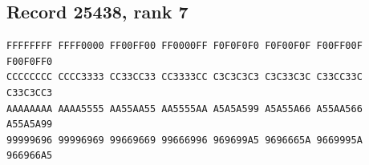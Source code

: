 \documentclass[11pt]{amsart}
\theoremstyle{definition}
\theoremstyle{remark}
\numberwithin{equation}{section}
\numberwithin{table}{section}
\begin{document}
\subsection*{Record 25438, rank 7}
\begin{Verbatim}[fontsize=\scriptsize,xleftmargin=1em]
FFFFFFFF FFFF0000 FF00FF00 FF0000FF F0F0F0F0 F0F00F0F F00FF00F F00F0FF0
CCCCCCCC CCCC3333 CC33CC33 CC3333CC C3C3C3C3 C3C33C3C C33CC33C C33C3CC3
AAAAAAAA AAAA5555 AA55AA55 AA5555AA A5A5A599 A5A55A66 A55AA566 A55A5A99
99999696 99996969 99669669 99666996 969699A5 9696665A 9669995A 966966A5
\end{Verbatim}
\par
{}\par
\end{document}

